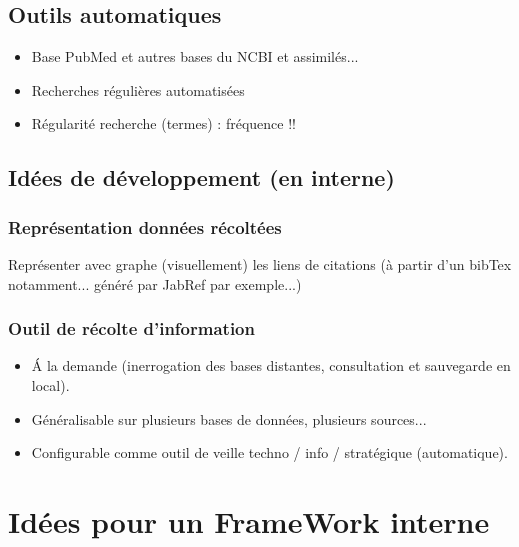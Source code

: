 \documentclass[11pt,twoside,a4paper]{article}
\begin{document}
\subsection{Outils automatiques}

\begin{itemize}
	\item Base PubMed et autres bases du NCBI et assimil{\'e}s...
	\item Recherches r{\'e}guli{\`e}res automatis{\'e}es
	\item R{\'e}gularit{\'e} recherche (termes) : fr{\'e}quence !!
\end{itemize}

\subsection{Id{\'e}es de d{\'e}veloppement (en interne)}

\subsubsection{Repr{\'e}sentation donn{\'e}es r{\'e}colt{\'e}es}

	Repr{\'e}senter avec graphe (visuellement) les liens de citations ({\`a} partir d'un bibTex notamment... g{\'e}n{\'e}r{\'e} par JabRef par exemple...)

\subsubsection{Outil de r{\'e}colte d'information}

\begin{itemize}
	\item {\'A} la demande (inerrogation des bases distantes, consultation et sauvegarde en local). 
	\item G{\'e}n{\'e}ralisable sur plusieurs bases de donn{\'e}es, plusieurs sources...
	\item Configurable comme outil de veille techno / info / strat{\'e}gique (automatique). 
\end{itemize}

\clearpage
\clearpage



\section{Id{\'e}es pour un FrameWork interne}
\end{document}
